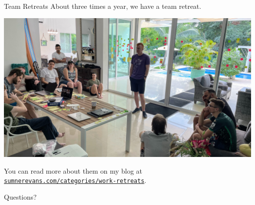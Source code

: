 \documentclass{beeper}
\begin{document}
\begin{frame}{Team Retreats}
    About three times a year, we have a team retreat.

    \centerline{\includegraphics[width=\textwidth]{images/retro}}

    {
        You can read more about them on my blog at
        \href{https://sumnerevans.com/categories/work-retreats/}{\texttt{sumnerevans.com/categories/work-retreats}}.
    }
\end{frame}

\begingroup
\def\insertframenumber{\relax}
\begin{frame}[standout]
    \Large
    Questions?
\end{frame}
\endgroup
\end{document}
